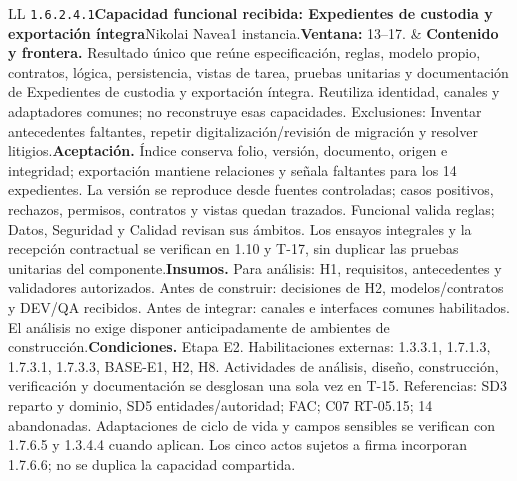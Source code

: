 \begin{longtable}{L{\tabcolsep\relax}L{\tabcolsep\relax}}
\texttt{1.\allowbreak{}6.\allowbreak{}2.\allowbreak{}4.\allowbreak{}1}\newline{}\textbf{Capacidad funcional recibida: Expedientes de custodia y exportación íntegra}\newline{}Nikolai Navea\newline{}1 instancia.\newline{}\textbf{Ventana:} 13--17. & \textbf{Contenido y frontera.} Resultado único que reúne especificación, reglas, modelo propio, contratos, lógica, persistencia, vistas de tarea, pruebas unitarias y documentación de Expedientes de custodia y exportación íntegra. Reutiliza identidad, canales y adaptadores comunes; no reconstruye esas capacidades. Exclusiones: Inventar antecedentes faltantes, repetir digitalización/revisión de migración y resolver litigios.\newline{}\textbf{Aceptación.} Índice conserva folio, versión, documento, origen e integridad; exportación mantiene relaciones y señala faltantes para los 14 expedientes. La versión se reproduce desde fuentes controladas; casos positivos, rechazos, permisos, contratos y vistas quedan trazados. Funcional valida reglas; Datos, Seguridad y Calidad revisan sus ámbitos. Los ensayos integrales y la recepción contractual se verifican en 1.10 y T-17, sin duplicar las pruebas unitarias del componente.\newline{}\textbf{Insumos.} Para análisis: H1, requisitos, antecedentes y validadores autorizados. Antes de construir: decisiones de H2, modelos/contratos y DEV/QA recibidos. Antes de integrar: canales e interfaces comunes habilitados. El análisis no exige disponer anticipadamente de ambientes de construcción.\newline{}\textbf{Condiciones.} Etapa E2. Habilitaciones externas: 1.3.3.1, 1.7.1.3, 1.7.3.1, 1.7.3.3, BASE-E1, H2, H8. Actividades de análisis, diseño, construcción, verificación y documentación se desglosan una sola vez en T-15. Referencias: SD3 reparto y dominio, SD5 entidades/autoridad; FAC; C07 RT-05.15; 14 abandonadas. Adaptaciones de ciclo de vida y campos sensibles se verifican con 1.7.6.5 y 1.3.4.4 cuando aplican. Los cinco actos sujetos a firma incorporan 1.7.6.6; no se duplica la capacidad compartida.\\\hline
\end{longtable}\endgroup
\begingroup\setlength{\tabcolsep}{3pt}
